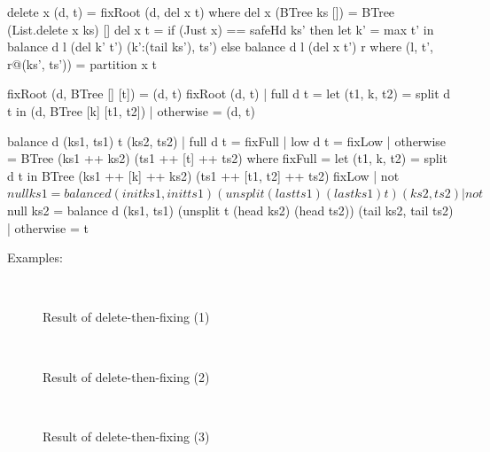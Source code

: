 \documentclass[b5paper]{article}
\begin{document}
\begin{Haskell}
delete x (d, t) = fixRoot (d, del x t) where
    del x (BTree ks []) = BTree (List.delete x ks) []
    del x t = if (Just x) == safeHd ks' then
                let k' = max t' in
                   balance d l (del k' t') (k':(tail ks'), ts')
              else balance d l (del x t') r
      where
        (l, t', r@(ks', ts')) = partition x t

fixRoot (d, BTree [] [t]) = (d, t)
fixRoot (d, t) | full d t  = let (t1, k, t2) = split d t in
                               (d, BTree [k] [t1, t2])
               | otherwise = (d, t)

balance d (ks1, ts1) t (ks2, ts2)
    | full d t  = fixFull
    | low  d t  = fixLow
    | otherwise = BTree (ks1 ++ ks2) (ts1 ++ [t] ++ ts2)
  where
    fixFull = let (t1, k, t2) = split d t in
                BTree (ks1 ++ [k] ++ ks2) (ts1 ++ [t1, t2] ++ ts2)
    fixLow | not $ null ks1 = balance d (init ks1, init ts1)
                                      (unsplit (last ts1) (last ks1) t)
                                      (ks2, ts2)
           | not $ null ks2 = balance d (ks1, ts1)
                                      (unsplit t (head ks2) (head ts2))
                                      (tail ks2, tail ts2)
           | otherwise = t
\end{Haskell}

Examples:

\begin{figure}[htbp]
  \centering
  \\
  \caption{Result of delete-then-fixing (1)} \label{fig:result-del-fp1}
\end{figure}

\begin{figure}[htbp]
  \centering
   \\
  \caption{Result of delete-then-fixing (2)} \label{fig:result-del-fp2}
\end{figure}

\begin{figure}[htbp]
  \centering
   \\
  \caption{Result of delete-then-fixing (3)} \label{fig:result-del-fp3}
\end{figure}
\end{document}
